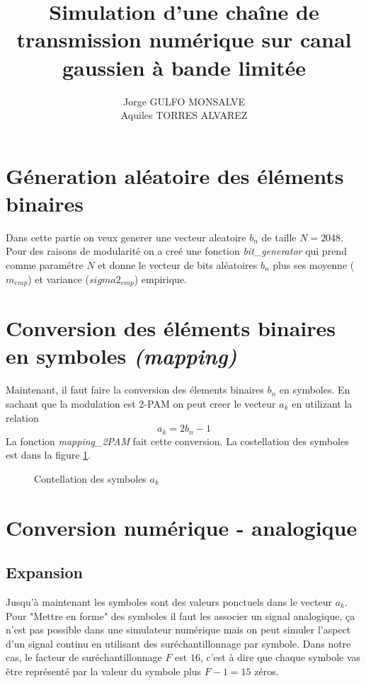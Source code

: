 \documentclass[a4paper,11pt]{article}
\title{Simulation d'une chaîne de transmission numérique sur canal gaussien à bande limitée\newline [Rapport]}
\author{Jorge GULFO MONSALVE\\Aquiles TORRES ALVAREZ}
\begin{document}
\maketitle

\section{Géneration aléatoire des éléments binaires}
Dans cette partie on veux generer une vecteur aleatoire $b_n$ de taille $N=2048$. Pour des raisons de modularité on a creé une fonction \emph{bit\_generator} qui prend comme paramétre $N$ et donne le vecteur de bits aléatoires $b_n$ plus ses moyenne ($m_{emp}$) et variance ($sigma2_{emp}$) empirique. 

\section{Conversion des éléments binaires en symboles \emph{(mapping)}}
Maintenant, il faut faire la conversion des élements binaires $b_n$ en symboles. En sachant que la modulation est 2-PAM on peut creer le vecteur $a_k$ en utilizant la relation
\[ a_k = 2b_n - 1\]
La fonction \emph{mapping\_2PAM } fait cette conversion. La costellation des symboles est dans la figure \ref{fig:sec1}.
\begin{figure}[htb]
	\begin{center}
	\caption{Contellation des symboles $a_k$}
	\label{fig:sec1}
	\end{center}
\end{figure} 

\section{Conversion numérique - analogique}

\subsection{Expansion}
Jusqu'à maintenant les symboles sont des valeurs ponctuels dans le vecteur $a_k$. Pour "Mettre en forme" des symboles il faut les associer un signal analogique, ça n'est pas possible dans une simulateur numérique mais on peut simuler l'aspect d'un signal continu en utilisant des suréchantillonnage par symbole. Dans notre cas, le facteur de suréchantillonnage $F$ est $16$, c'est à dire que chaque symbole vas être représenté par la valeur du symbole plus $F-1=15$ zéros.
\end{document}
